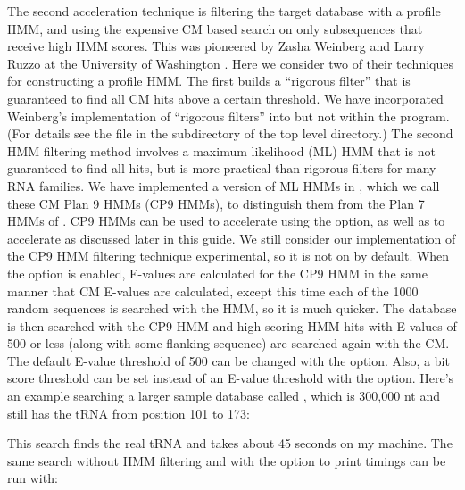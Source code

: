 The second acceleration technique is filtering the target database
with a profile HMM, and using the expensive CM based search on only
subsequences that receive high HMM scores. This was pioneered by Zasha
Weinberg and Larry Ruzzo at the University of Washington
\cite{WeinbergRuzzo04,WeinbergRuzzo04b,WeinbergRuzzo06}. Here we
consider two of their techniques for constructing a profile HMM. The
first builds a ``rigorous filter'' that is guaranteed to find all CM
hits above a certain threshold. We have incorporated Weinberg's
implementation of ``rigorous filters'' into  but
not within the  program. (For details see the file
 in the 
subdirectory of the top level  directory.) The second
HMM filtering method involves a maximum likelihood (ML) HMM that is
not guaranteed to find all hits, but is more practical than rigorous
filters for many RNA families. We have implemented a version of ML
HMMs in , which we call these CM Plan 9 HMMs (CP9
HMMs), to distinguish them from the Plan 7 HMMs of .
CP9 HMMs can be used to accelerate  using the
 option, as well as to accelerate  as
discussed later in this guide.  We still consider our implementation
of the CP9 HMM filtering technique experimental, so it is not on by
default.  When the  option is enabled, E-values are
calculated for the CP9 HMM in the same manner that CM E-values are
calculated, except this time each of the 1000 random sequences is
searched with the HMM, so it is much quicker. The database is then
searched with the CP9 HMM and high scoring HMM hits with E-values of
500 or less (along with some flanking sequence) are searched again with
the CM.  The default E-value threshold of 500 can be changed with the
 option. Also, a bit score threshold can be set instead
of an E-value threshold with the  option.  Here's an
example searching a larger sample database called
, which is 300,000 nt and still has the tRNA
from position 101 to 173:


This search finds the real tRNA and takes about 45 seconds on my
machine. The same search without HMM filtering and with the 
option to print timings can be run with:


